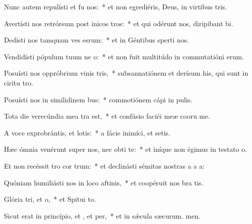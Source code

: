 \item Nunc autem repulísti et fu nos:~* et non egrediéris, Deus, in virtibus tris.
\item Avertísti nos retrórsum post inicos tros:~* et qui odérunt nos, diripibant bi.
\item Dedísti nos tamquam ves esrum:~* et in Géntibus sperti nos.
\item Vendidísti pópulum tuum ne o:~* et non fuit multitúdo in commutatióni erum.
\item Posuísti nos oppróbrium vinis tris,~* subsannatiónem et derísum his, qui sunt in ciritu tro.
\item Posuísti nos in similidinem bus:~* commotiónem cápi in pulis.
\item Tota die verecúndia mea tra  est,~* et confúsio faciéi meæ cooru me.
\item A voce exprobrántis, et lotis:~* a fácie inimíci, et setis.
\item Hæc ómnia venérunt super nos, nec obti  te:~* et iníque non égimus in testato o.
\item Et non recéssit tro cor trum:~* et declinásti sémitas nostras a a a:
\item Quóniam humiliásti nos in loco aftinis,~* et coopéruit nos bra tis.
\item Glória tri, et o,~* et Spitui to.
\item Sicut erat in princípio, et , et per,~* et in sǽcula sæcurum. men.

